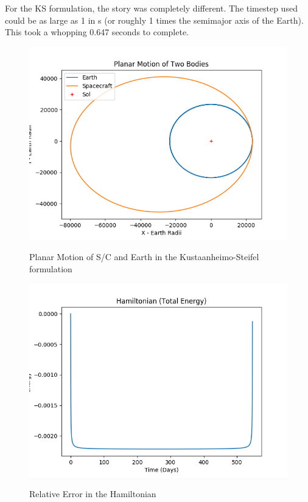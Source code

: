 \documentclass[11pt,twoside,letterpaper]{article}
\begin{document}
  For the KS formulation, the story was completely different. The
  timestep used could be as large as 1 in s (or roughly 1 times the
  semimajor axis of the Earth). This took a whopping 0.647 seconds to
  complete.

  \begin{figure}
    \caption{Planar Motion of S/C and Earth in the Kustaanheimo-Steifel formulation}
    \centering
    \includegraphics[scale=0.5]{PlanarPathKS}
    \label{kspath}
  \end{figure}

    \begin{figure}
    \caption{Relative Error in the Hamiltonian}
    \centering
    \includegraphics[scale=0.5]{HamiltonianKS}
    \label{ksHam}
  \end{figure}
\end{document}
